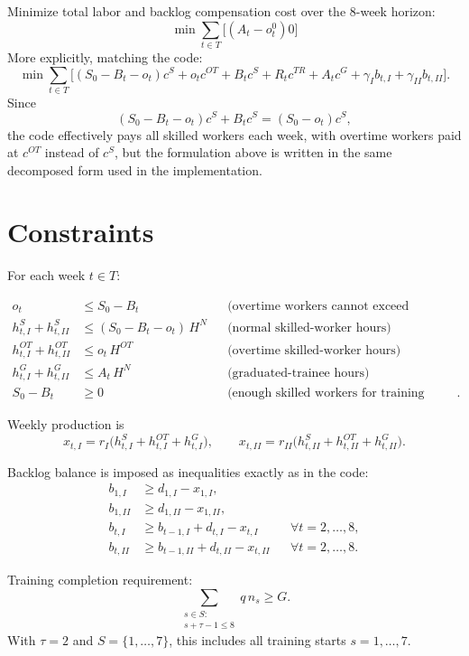 Minimize total labor and backlog compensation cost over the 8-week horizon:
\[
\min \sum_{t\in T}
\Big[
(A_t-o_t^0)0
\Big]
\]
More explicitly, matching the code:
\[
\min \sum_{t\in T}
\Big[
(S_0-B_t-o_t)c^S + o_t c^{OT} + B_t c^S + R_t c^{TR} + A_t c^G + \gamma_I b_{t,I} + \gamma_{II} b_{t,II}
\Big].
\]
Since
\[
(S_0-B_t-o_t)c^S + B_t c^S = (S_0-o_t)c^S,
\]
the code effectively pays all skilled workers each week, with overtime workers paid at $c^{OT}$ instead of $c^S$, but the formulation above is written in the same decomposed form used in the implementation.

\section*{Constraints}

For each week $t\in T$:

\begin{align}
o_t &\le S_0 - B_t
&& \text{(overtime workers cannot exceed available skilled workers)} \\
h^S_{t,I}+h^S_{t,II} &\le (S_0-B_t-o_t)\,H^N
&& \text{(normal skilled-worker hours)} \\
h^{OT}_{t,I}+h^{OT}_{t,II} &\le o_t\,H^{OT}
&& \text{(overtime skilled-worker hours)} \\
h^G_{t,I}+h^G_{t,II} &\le A_t\,H^N
&& \text{(graduated-trainee hours)} \\
S_0-B_t &\ge 0
&& \text{(enough skilled workers for training assignments)}.
\end{align}

Weekly production is
\[
x_{t,I}=r_I\big(h^S_{t,I}+h^{OT}_{t,I}+h^G_{t,I}\big),
\qquad
x_{t,II}=r_{II}\big(h^S_{t,II}+h^{OT}_{t,II}+h^G_{t,II}\big).
\]

Backlog balance is imposed as inequalities exactly as in the code:
\begin{align}
b_{1,I} &\ge d_{1,I} - x_{1,I}, \\
b_{1,II} &\ge d_{1,II} - x_{1,II}, \\
b_{t,I} &\ge b_{t-1,I} + d_{t,I} - x_{t,I}
&& \forall t=2,\dots,8, \\
b_{t,II} &\ge b_{t-1,II} + d_{t,II} - x_{t,II}
&& \forall t=2,\dots,8.
\end{align}

Training completion requirement:
\[
\sum_{\substack{s\in S:\\ s+\tau-1\le 8}} q\,n_s \ge G.
\]
With $\tau=2$ and $S=\{1,\dots,7\}$, this includes all training starts $s=1,\dots,7$.

